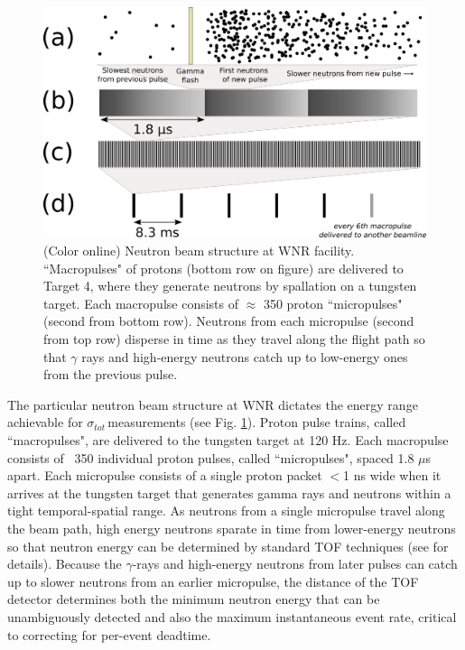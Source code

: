 \documentclass[twocolumn,secnumarabic,amssymb, nobibnotes, aps, prl,
superscriptaddress, nobalancelastpage]{revtex4}
\newcommand{\tots}{\ensuremath{\sigma_{tot}}\,}
\begin{document}
\begin{figure}
    \includegraphics[scale=0.4]{figures/beamStructure.png}
    \caption{(Color online) Neutron beam structure at WNR facility. ``Macropulses" of protons (bottom row on figure) are delivered to Target 
        4, where they generate
        neutrons by spallation on a tungsten target. Each macropulse consists of
        $\approx$ 350 proton ``micropulses" (second from bottom row). Neutrons
        from each micropulse (second from top row) disperse in
        time as they travel along the flight path so that $\gamma$ rays and high-energy 
        neutrons catch up
to low-energy ones from the previous pulse.}
    \label{BeamStructure}
\end{figure}

The particular neutron beam structure at WNR dictates the energy range
achievable for \tots measurements (see Fig. \ref{BeamStructure}).
Proton pulse trains, called ``macropulses", are delivered to the tungsten target at 120 Hz.
Each macropulse consists of ~350 individual proton pulses, called ``micropulses", spaced 1.8 
$\mu$s apart. Each micropulse consists of a single proton packet $<$1 ns wide when it 
arrives at the tungsten target that generates gamma rays and neutrons within a tight
temporal-spatial range. As neutrons from a single micropulse travel along the beam path, 
high energy neutrons sparate in time from lower-energy neutrons so that neutron
energy can be determined by standard TOF techniques (see \cite{Moore1980} for details).
Because the $\gamma$-rays and high-energy neutrons from later pulses can catch
up to slower neutrons from an earlier micropulse, the distance of the TOF
detector determines both the minimum neutron energy that can be unambiguously
detected and also the maximum instantaneous event rate, critical to correcting
for per-event deadtime.
\end{document}
